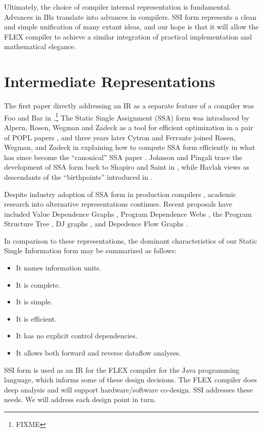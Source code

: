 \documentclass[12pt,notitlepage]{article}
\begin{document}
Ultimately, the choice of compiler internal representation is fundamental.
Advances in IRs translate into advances in compilers.  SSI form
represents a clean and simple unification of many extant ideas, and
our hope is that it will allow the FLEX compiler to achieve a similar
integration of practical implementation and mathematical elegance.

\section{Intermediate Representations}
The first paper directly addressing an IR as a separate feature of a
compiler was Foo and Bar in \cite{foobar}.\footnote{FIXME}
The Static Single Assignment (SSA) form was introduced by 
Alpern, Rosen, Wegman and Zadeck
as a tool for efficient optimization in a pair of POPL
papers \cite{alpern88:ssa,rosen88:gvn}, and three years later Cytron
and Ferrante joined Rosen, Wegman, and Zadeck in explaining how to
compute SSA form efficiently in what has since become the 
``canonical'' SSA paper \cite{cytron89:ssa}.  Johnson and Pingali
\cite{johnson93:dfg} trace the development of SSA form back to Shapiro
and Saint in \cite{shapiro70:ssa}, while Havlak \cite{havlak94:isa}
views  as descendants of the ``birthpoints'' introduced
in \cite{reif81:sym}.

Despite industry adoption of SSA form in production compilers
\cite{chow96:hssa,chow97:ssapre}, academic research into alternative
representations continues.
Recent proposals have included Value Dependence Graphs
\cite{weise94:vdg}, Program Dependence Webs \cite{ballance90:pdw},
the Program Structure Tree \cite{johnson94:pst},
DJ graphs \cite{sreedhar96:dj}, and Depedence Flow Graphs
\cite{johnson93:dfg}.

In comparison to these representations, the dominant characteristics of
our Static Single Information form may be summarized as follows:
\begin{itemize}
\item It names information units.
\item It is complete.
\item It is simple.
\item It is efficient.
\item It has no explicit control dependencies.
\item It allows both forward and reverse dataflow analyses.
\end{itemize}
SSI form is used as an IR for the FLEX compiler for the Java
programming language, which informs some of these design decisions.
The FLEX compiler does deep analysis and will support
hardware/software co-design.  SSI addresses these needs.  We will
address each design point in turn.
\end{document}
